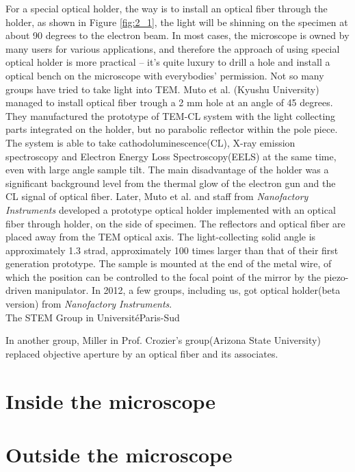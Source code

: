 For a special optical holder, the way is to install an optical fiber through the holder, as shown in Figure \ref{fig:2_1}, the light will be shinning on the specimen at about 90 degrees to the electron beam. In most cases, the microscope is owned by many users for various applications, and therefore the approach of using special optical holder is more practical -- it's quite luxury to drill a hole and install a optical bench on the microscope with everybodies' permission. 
Not so many groups have tried to take light into TEM. Muto et al. (Kyushu University) managed to install optical fiber trough a 2 mm hole at an angle of 45 degrees.\cite{Tanabe2002,Furumoto2013} They manufactured the prototype of TEM-CL system with the light collecting parts integrated on the holder, but no parabolic reflector within the pole piece. The system is able to take cathodoluminescence(CL), X-ray emission spectroscopy and Electron Energy Loss Spectroscopy(EELS) at the same time, even with large angle sample tilt. The main disadvantage of the holder was a significant background level from the thermal glow of the electron gun and the CL signal of optical fiber. Later, Muto et al. and staff from {\em Nanofactory Instruments} developed a prototype optical holder implemented with an optical fiber through holder, on the side of specimen. The reflectors and optical fiber are placed away from the TEM optical axis. The light-collecting solid angle is approximately 1.3 strad, approximately 100 times larger than that of their first generation prototype. The sample is mounted at the end of the metal wire, of which the position can be controlled to the focal point of the mirror by the piezo-driven manipulator. In 2012, a few groups, including us, got optical holder(beta version) from {\em Nanofactory Instruments}. \\

The STEM Group in UniversitéParis-Sud \cite{Zagonel2011}

In another group, Miller in Prof. Crozier's group(Arizona State University) replaced objective aperture by an optical fiber and its associates\cite{Miller2012}. 

\section{Inside the microscope}

\section{Outside the microscope}

